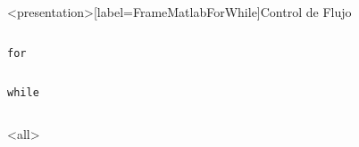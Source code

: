 \begin{frame}<presentation>[label=FrameMatlabForWhile]{Control de Flujo}
  \begin{columns}
    \hfill


  \end{columns}

  \begin{columns}[T]
      \flushright \large\texttt{for}

      \begin{codeblock}
	
      \end{codeblock}

      \begin{codeblock}
	

      \end{codeblock}

  \end{columns}

  \begin{columns}[T]
    \flushright \large\texttt{while}

      \begin{codeblock}
	
      \end{codeblock}

      \begin{codeblock}
	
      \end{codeblock}

  \end{columns}
\end{frame}

\mode<all>
